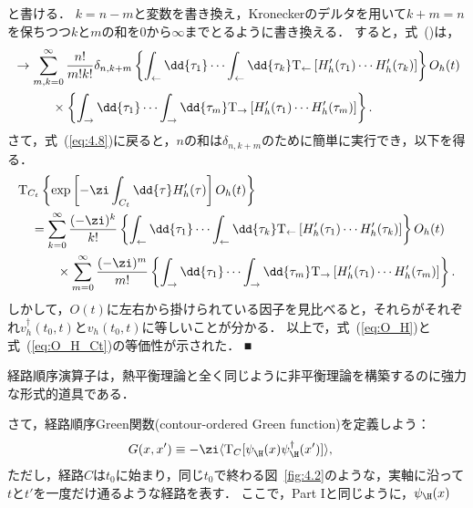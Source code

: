 \documentclass[a4paper,10pt]{jsarticle}
\begin{document}
と書ける．
$k = n - m$と変数を書き換え，Kroneckerのデルタを用いて$k + m = n$を保ちつつ$k$と$m$の和を$0$から$\infty$までとるように書き換える．
すると，式~(\label{eq:4.11})は，
\begin{align}
& \to \sum_{m, k = 0}^{\infty} \frac{n!}{m! k!} \delta_{n, k + m}
	\left\{
		\int_{\leftarrow} \dd{\tau_1} \cdots \int_{\leftarrow} \dd{\tau_k} \mathrm{T}_{\leftarrow} \left[ H'_h (\tau_1) \cdots H'_h (\tau_k) \right]
	\right\}
	O_h (t)
\notag \\ & \hspace{3em} \times
	\left\{
		\int_{\rightarrow} \dd{\tau_1} \cdots \int_{\rightarrow} \dd{\tau_m} \mathrm{T}_{\rightarrow} \left[ H'_h (\tau_1) \cdots H'_h (\tau_m) \right]
	\right\}
.\end{align}
さて，式~(\ref{eq:4.8})に戻ると，$n$の和は$\delta_{n, k+m}$のために簡単に実行でき，以下を得る．
\begin{align}
& \mathrm{T}_{C_t} \left\{ \exp \left[ - \zi \int_{C_t} \dd{\tau} H'_h (\tau) \right] O_h (t) \right\}
\notag \\ & \hspace{1em}
	= \sum_{k = 0}^{\infty} \frac{(-\zi)^k}{k!}
	\left\{
		\int_{\leftarrow} \dd{\tau_1} \cdots \int_{\leftarrow} \dd{\tau_k} \mathrm{T}_{\leftarrow} \left[ H'_h (\tau_1) \cdots H'_h (\tau_k) \right]
	\right\}
	O_h (t)
\notag \\ & \hspace{3em} \times
	\sum_{m = 0}^{\infty} \frac{(-\zi)^m}{m!}
	\left\{
		\int_{\rightarrow} \dd{\tau_1} \cdots \int_{\rightarrow} \dd{\tau_m} \mathrm{T}_{\rightarrow} \left[ H'_h (\tau_1) \cdots H'_h (\tau_m) \right]
	\right\}
.\end{align}
しかして，$O (t)$に左右から掛けられている因子を見比べると，それらがそれぞれ$v_h^{\dagger} (t_0, t)$と$v_h (t_0, t)$に等しいことが分かる．
以上で，式~(\ref{eq:O_H})と式~(\ref{eq:O_H_Ct})の等価性が示された．
■

経路順序演算子は，熱平衡理論と全く同じように非平衡理論を構築するのに強力な形式的道具である．

さて，経路順序Green関数(contour-ordered Green function)を定義しよう：
\begin{align}
G (x, x')
	& \equiv - \zi \langle \mathrm{T}_C [ \psi^{}_{\H} (x) \psi^{\dagger}_{\H} (x') ] \rangle
,\end{align}
ただし，経路$C$は$t_0$に始まり，同じ$t_0$で終わる図~\ref{fig:4.2}のような，実軸に沿って$t$と$t'$を一度だけ通るような経路を表す．
ここで，Part Iと同じように，$\psi_{\H} (x)$
\end{document}
